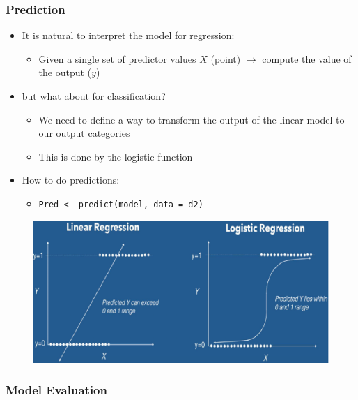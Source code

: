 \documentclass[a4paper]{article}
\begin{document}
			\subsubsection{Prediction}
			
			\begin{itemize}
				\item It is natural to interpret the model for regression:
					\begin{itemize}
						\item Given a single set of predictor values $X$ (point) $\rightarrow$ compute the value of the output ($y$)
					\end{itemize}
				\item but what about for classification?
					\begin{itemize}
						\item We need to define a way to transform the output of the linear model to our output categories
						\item This is done by the logistic function
					\end{itemize}
				\item How to do predictions:
					\begin{itemize}
						\item \texttt{Pred <- predict(model, data = d2)}
					\end{itemize}
			\end{itemize}
				
			\begin{figure}[htb!]
				\centering
				\includegraphics[width=.6\textwidth]{img/sw08/prediction.png}
			\end{figure}
		
			\subsubsection{Model Evaluation}
			
\end{document}
